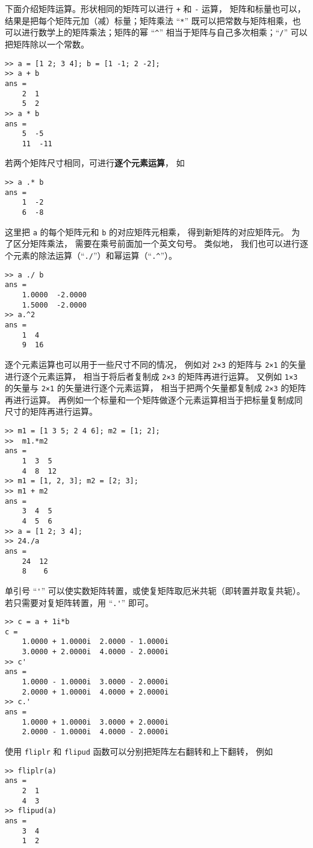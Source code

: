 下面介绍矩阵运算。形状相同的矩阵可以进行 \verb|+| 和 \verb|-| 运算， 矩阵和标量也可以， 结果是把每个矩阵元加（减）标量；矩阵乘法 “\verb|*|” 既可以把常数与矩阵相乘，也可以进行数学上的矩阵乘法；矩阵的幂 “\verb|^|” 相当于矩阵与自己多次相乘；“\verb|/|” 可以把矩阵除以一个常数。
\begin{lstlisting}[language=matlabC]
>> a = [1 2; 3 4]; b = [1 -1; 2 -2];
>> a + b
ans =
    2  1
    5  2
>> a * b
ans =
    5  -5
    11  -11
\end{lstlisting}
若两个矩阵尺寸相同，可进行\textbf{逐个元素运算}， 如
\begin{lstlisting}[language=matlabC]
>> a .* b
ans =
    1  -2
    6  -8
\end{lstlisting}
这里把 \verb|a| 的每个矩阵元和 \verb|b| 的对应矩阵元相乘， 得到新矩阵的对应矩阵元。 为了区分矩阵乘法， 需要在乘号前面加一个英文句号。 类似地， 我们也可以进行逐个元素的除法运算（“\verb|./|”）和幂运算（“\verb|.^|”）。
\begin{lstlisting}[language=matlabC]
>> a ./ b
ans =
    1.0000  -2.0000
    1.5000  -2.0000
>> a.^2
ans =
    1  4
    9  16
\end{lstlisting}

逐个元素运算也可以用于一些尺寸不同的情况， 例如对 \verb|2×3| 的矩阵与 \verb|2×1| 的矢量进行逐个元素运算， 相当于将后者复制成 \verb|2×3| 的矩阵再进行运算。 又例如 \verb|1×3| 的矢量与 \verb|2×1| 的矢量进行逐个元素运算， 相当于把两个矢量都复制成 \verb|2×3| 的矩阵再进行运算。 再例如一个标量和一个矩阵做逐个元素运算相当于把标量复制成同尺寸的矩阵再进行运算。

\begin{lstlisting}[language=matlabC]
>> m1 = [1 3 5; 2 4 6]; m2 = [1; 2];
>>  m1.*m2
ans =
    1  3  5
    4  8  12
>> m1 = [1, 2, 3]; m2 = [2; 3];
>> m1 + m2
ans =
    3  4  5
    4  5  6
>> a = [1 2; 3 4];
>> 24./a
ans =
    24  12
    8    6
\end{lstlisting}

单引号 “\verb|'|” 可以使实数矩阵转置，或使复矩阵取厄米共轭（即转置并取复共轭）。若只需要对复矩阵转置，用 “\verb|.'|” 即可。
\begin{lstlisting}[language=matlabC]
>> c = a + 1i*b
c =
    1.0000 + 1.0000i  2.0000 - 1.0000i
    3.0000 + 2.0000i  4.0000 - 2.0000i
>> c'
ans =
    1.0000 - 1.0000i  3.0000 - 2.0000i
    2.0000 + 1.0000i  4.0000 + 2.0000i
>> c.'
ans =
    1.0000 + 1.0000i  3.0000 + 2.0000i
    2.0000 - 1.0000i  4.0000 - 2.0000i
\end{lstlisting}
使用 \verb|fliplr| 和 \verb|flipud| 函数可以分别把矩阵左右翻转和上下翻转， 例如
\begin{lstlisting}[language=matlabC]
>> fliplr(a)
ans =
    2  1
    4  3
>> flipud(a)
ans =
    3  4
    1  2
\end{lstlisting}

